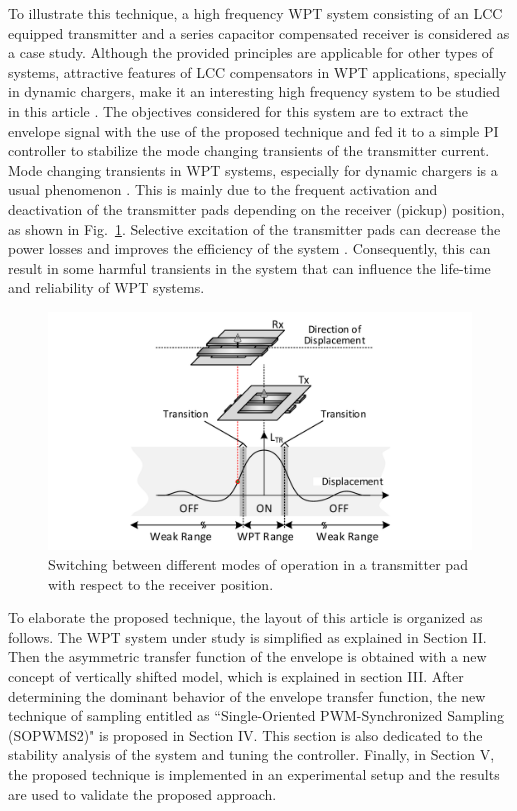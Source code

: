 \documentclass[journal,a4paper,10pt,twoside]{IEEEtran} %
\begin{document}
	To illustrate this technique, a high frequency WPT system consisting of an LCC equipped transmitter and a series capacitor compensated receiver is considered as a case study. Although the provided principles are applicable for other types of systems, attractive features of LCC compensators in WPT applications, specially in dynamic chargers, make it an interesting high frequency system to be studied in this article \cite{farajizadeh, pantic, MPLCC}. The objectives considered for this system are to extract the envelope signal with the use of the proposed technique and fed it to a simple PI controller to stabilize the mode changing transients of the transmitter current.
	Mode changing transients in WPT systems, especially for dynamic chargers is a usual phenomenon \cite{farajizadeh,MODE_1,MODE_2,MODE_3}. This is mainly due to the frequent activation and deactivation of the transmitter pads depending on the receiver (pickup) position, as shown in Fig.~\ref{FIG1}. Selective excitation of the transmitter pads can decrease the power losses and improves the efficiency of the system \cite{farajizadeh,MODE_2,MODE_3}. Consequently, this can result in some harmful transients in the system that can influence the life-time and reliability of WPT systems.
	
	\begin{figure}
	    \centering
	    \includegraphics[clip, trim=2cm 0.5cm 2cm 0cm, width=0.8\columnwidth]{FIGS/FIG1.pdf}
	    \caption{Switching between different modes of operation in a transmitter pad with respect to the receiver position.}
	    \label{FIG1}
	\end{figure}
	
	To elaborate the proposed technique, the layout of this article is organized as follows. The WPT system under study is simplified as explained in Section II. Then the asymmetric transfer function of the envelope is obtained with a new concept of vertically shifted model, which is explained in section III. After determining the dominant behavior of the envelope transfer function, the new technique of sampling entitled as ``{Single-Oriented PWM-Synchronized Sampling} (SOPWMS2)" is proposed in Section IV. This section is also dedicated to the stability analysis of the system and tuning the controller. Finally, in Section V, the proposed technique is implemented in an experimental setup and the results are used to validate the proposed approach.
\end{document}
